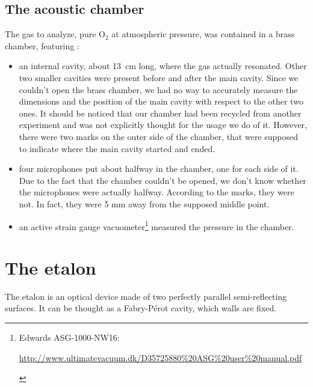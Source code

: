 \documentclass[a4paper,11pt]{article}
\begin{document}
\subsection{The acoustic chamber} 
 The gas to analyze, pure O$_2$ at atmospheric pressure, was contained in a brass chamber, featuring :
\begin{itemize}
\item an internal cavity, about \mbox{13 cm} long, where the gas actually resonated. Other two smaller cavities were present before and after the main cavity. Since we couldn't open the brass chamber, we had no way to accurately measure the dimensions and the position of the main cavity with respect to the other two ones. It should be noticed that our chamber had been recycled from another experiment and was not explicitly thought for the usage we do of it. However, there were two marks on the outer side of the chamber, that were supposed to indicate where the main cavity started and ended.
\item four microphones put about halfway in the chamber, one for each side of it. Due to the fact that the chamber couldn't be opened, we don't know whether the microphones were actually halfway. According to the marks, they were not. In fact, they were 5 mm away from the supposed middle point.
\item an active strain gauge vacuometer\footnote{Edwards ASG-1000-NW16:\vspace{-10pt}
\begin{flushright} \url{http://www.ultimatevacuum.dk/D35725880\%20ASG\%20user\%20manual.pdf}
\end{flushright}} measured the pressure in the chamber. 
\end{itemize}

\newpage
\appendix
\section{The etalon}
The etalon is an optical device made of two perfectly parallel semi-reflecting surfaces. It can be thought as a Fabry-P\'erot cavity, which walls are fixed.
\end{document}
